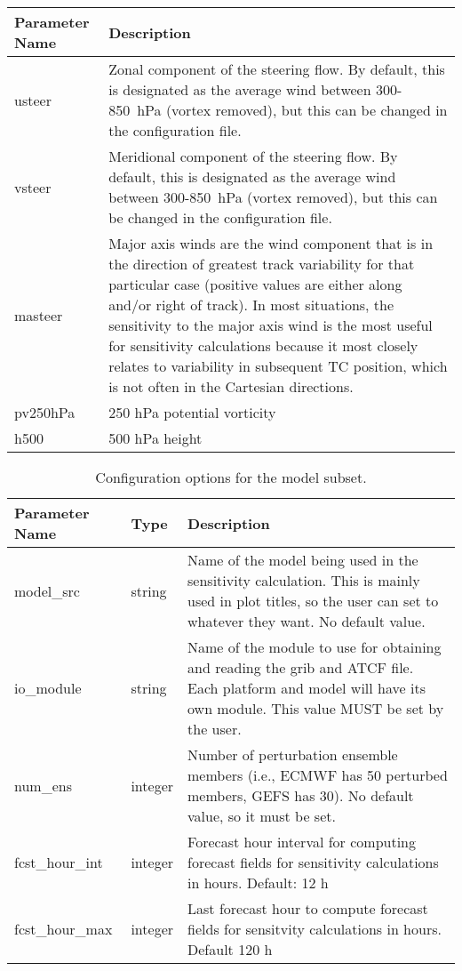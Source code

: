 \documentclass[psfig,12pt]{article}
\begin{document}
\begin{table}[H]
\begin{center}
\begin{tabular}{|p{1.25in}|p{5.0in}|}
\hline
Parameter Name & Description \\  \hline\hline
usteer & Zonal component of the steering flow.  By default, this is designated as the average wind between
300-850~hPa (vortex removed), but this can be changed in the configuration file. \\ \hline
vsteer & Meridional component of the steering flow.  By default, this is designated as the average wind between
300-850~hPa (vortex removed), but this can be changed in the configuration file. \\ \hline
masteer & Major axis winds are the wind component that is in the direction of greatest track variability for 
that particular case (positive values are either along and/or right of track).  In most situations, the 
sensitivity to the major axis wind is the most useful for sensitivity calculations because it most closely 
relates to variability in subsequent TC position, which is not often in the Cartesian directions.  \\ \hline
pv250hPa & 250 hPa potential vorticity \\ \hline
h500 & 500 hPa height \\ \hline
\end{tabular}
\end{center}
\end{table}

\begin{table}[H]
\caption{Configuration options for the model subset.}
\begin{center}
\begin{tabular}{|p{1.25in}|p{0.5in}|p{4.5in}|}
\hline
Parameter Name & Type & Description \\  \hline\hline
model\_src & string & Name of the model being used in the sensitivity calculation.  This is mainly used in
plot titles, so the user can set to whatever they want.  No default value.  \\  \hline
io\_module & string & Name of the module to use for obtaining and reading the grib and ATCF file.  Each
platform and model will have its own module.  This value MUST be set by the user. \\  \hline
num\_ens & integer & Number of perturbation ensemble members (i.e., ECMWF has 50 perturbed members, 
GEFS has 30).  No default value, so it must be set. \\  \hline
fcst\_hour\_int & integer & Forecast hour interval for computing forecast fields for sensitivity 
calculations in hours.  Default:  12 h \\  \hline
fcst\_hour\_max & integer & Last forecast hour to compute forecast fields for sensitvity 
calculations in hours.  Default 120 h \\  \hline
\end{tabular}
\end{center}
\end{table}
\end{document}
